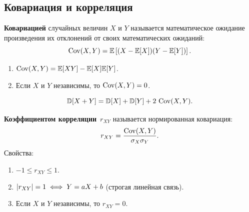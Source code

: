 \subsection{Ковариация и корреляция}

\newpage
\begin{definition}
\textbf{Ковариацией} случайных величин $X$ и $Y$ называется математическое ожидание произведения их отклонений от своих математических ожиданий:
\[
\operatorname{Cov}(X, Y) = \mathbb{E}\left[(X - \mathbb{E}[X])(Y - \mathbb{E}[Y])\right].
\]
\end{definition}

\begin{theorem}
\leavevmode
\begin{enumerate}
\item $\operatorname{Cov}(X, Y) = \mathbb{E}[XY] - \mathbb{E}[X]\mathbb{E}[Y]$.
\item Если $X$ и $Y$ независимы, то $\operatorname{Cov}(X, Y) = 0$.
\end{enumerate}
\end{theorem}

\begin{theorem}
\[
\mathbb{D}[X + Y] = \mathbb{D}[X] + \mathbb{D}[Y] + 2\,\operatorname{Cov}(X, Y).
\]
\end{theorem}

\begin{definition}
\textbf{Коэффициентом корреляции}~$r_{XY}$ называется нормированная ковариация:
\[
r_{XY} = \frac{\operatorname{Cov}(X, Y)}{\sigma_X \sigma_Y}.
\]
Свойства:
\begin{enumerate}
\item $-1 \le r_{XY} \le 1$.
\item $\lvert r_{XY}\rvert = 1 \iff Y = aX + b$ (строгая линейная связь).
\item Если $X$ и $Y$ независимы, то $r_{XY} = 0$.
\end{enumerate}
\end{definition}

